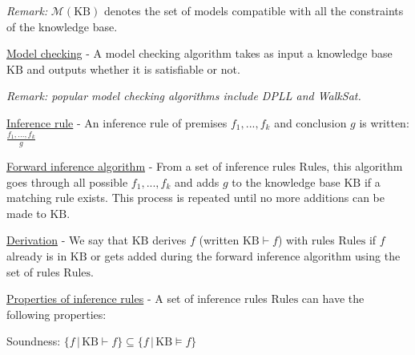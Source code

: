 \documentclass[4pt,landscape]{article}
\begin{document}
\begin{multicols*}{4}
 {\tiny \textit{Remark:} $\mathcal{M}(\textrm{KB})$ denotes the set of models compatible with all the constraints of the knowledge base.}\par
 {\tiny \underline{Model checking} - A model checking algorithm takes as input a knowledge base $\textrm{KB}$ and outputs whether it is satisfiable or not.}\par
 {\tiny \textit{Remark: popular model checking algorithms include DPLL and WalkSat.}}\par
 {\tiny \underline{Inference rule} - An inference rule of premises $f_1,...,f_k$ and conclusion $g$ is written: $\frac{f_1,...,f_k}{g}$}\par
 {\tiny \underline{Forward inference algorithm} - From a set of inference rules $\textrm{Rules}$, this algorithm goes through all possible $f_1, ..., f_k$ and adds $g$ to the knowledge base $\textrm{KB}$ if a matching rule exists. This process is repeated until no more additions can be made to $\textrm{KB}$.}\par
 {\tiny \underline{Derivation} - We say that $\textrm{KB}$ derives $f$ (written $\textrm{KB}\vdash f$) with rules $\textrm{Rules}$ if $f$ already is in $\textrm{KB}$ or gets added during the forward inference algorithm using the set of rules $\textrm{Rules}$.}\par
 {\tiny \underline{Properties of inference rules} - A set of inference rules $\textrm{Rules}$ can have the following properties:}\par
 {\tiny \textrm{Soundness:}
 $\{f \, | \, \textrm{KB}\vdash f\}\subseteq\{f \, | \, \textrm{KB}\models f\}$}\par

\end{multicols*}
\end{document}
